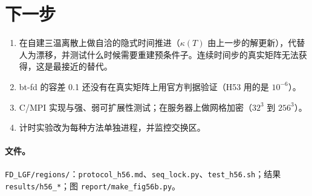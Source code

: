 \documentclass[11pt,a4paper]{ctexart}
\begin{document}
\section{下一步}
\begin{enumerate}
\item 在自建三温离散上做自洽的隐式时间推进（$\kappa(T)$ 由上一步的解更新），代替人为漂移，并测试什么时候需要重建预条件子。连续时间步的真实矩阵无法获得，这是最接近的替代。
\item bt-fd 的容差 0.1 还没有在真实矩阵上用官方判据验证（H53 用的是 $10^{-6}$）。
\item C/MPI 实现与强、弱可扩展性测试；在服务器上做网格加密（$32^3$ 到 $256^3$）。
\item 计时实验改为每种方法单独进程，并监控交换区。
\end{enumerate}

\paragraph{文件。}\texttt{FD\_LGF/regions/}：\texttt{protocol\_h56.md}、\texttt{seq\_lock.py}、\texttt{test\_h56.sh}；结果 \texttt{results/h56\_*}；图 \texttt{report/make\_fig56b.py}。
\end{document}
